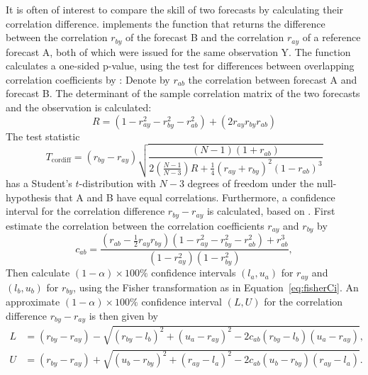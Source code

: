 \documentclass[article]{jss}\usepackage[]{graphicx}\usepackage[]{color}
\begin{document}
It is often of interest to compare the skill of two forecasts by calculating their correlation difference.
 implements the function  that returns the difference between the correlation $r_{by}$ of the forecast B and the correlation $r_{ay}$ of a reference forecast A, both of which were issued for the same observation Y.
The function calculates a one-sided p-value, using the test for differences between overlapping correlation coefficients by \citet{steiger1980tests}:
Denote by $r_{ab}$ the correlation between forecast A and forecast B.
The determinant of the sample correlation matrix of the two forecasts and the observation is calculated:
%
\begin{equation}
R  = (1 - r_{ay}^2 - r_{by}^2 - r_{ab}^2) + (2 r_{ay} r_{by} r_{ab})
\end{equation}
%
The test statistic
%
\begin{equation}
T_{\text{cordiff}}  = (r_{by} - r_{ay}) \sqrt{\frac{(N-1)(1+r_{ab})}{2\left(\frac{N-1}{N-3}\right) R+\frac{1}{4}(r_{ay}+r_{by})^2 (1-r_{ab})^3}}\label{eq:T2}
\end{equation}
%
has a Student's $t$-distribution with $N-3$ degrees of freedom under the null-hypothesis that A and B have equal correlations.
Furthermore, a confidence interval for the correlation difference $r_{by}-r_{ay}$ is calculated, based on \citet{zou2007toward}.
First estimate the correlation between the correlation coefficients $r_{ay}$ and $r_{by}$ by
%
\begin{equation}
c_{ab} = \frac{\left(r_{ab} - \frac{1}{2}  r_{ay}  r_{by}\right)  \left(1 - r_{ay}^2 - r_{by}^2 - r_{ab}^2\right) + r_{ab}^3}{(1-r_{ay}^2)(1-r_{by}^2)},
\end{equation}
%
Then calculate $(1-\alpha)\times 100\%$ confidence intervals $(l_a, u_a)$ for $r_{ay}$ and $(l_b, u_b)$ for $r_{by}$, using the Fisher transformation as in Equation~\ref{eq:fisherCi}.
An approximate $(1-\alpha)\times 100\%$ confidence interval $(L,U)$ for the correlation difference $r_{by} - r_{ay}$ is then given by
%
\begin{align}
L & = (r_{by} - r_{ay}) - \sqrt{(r_{by} - l_b)^2 + (u_a-r_{ay})^2 - 2  c_{ab}  (r_{by} - l_b) 
(u_a - r_{ay})},\nonumber\\
U & =  (r_{by} - r_{ay}) + \sqrt{(u_{b} - r_{by})^2 + (r_{ay}-l_a)^2 - 2 c_{ab} (u_b-r_{by})(r_{ay}-l_a)}.\label{eq:zou}
\end{align}
\end{document}
